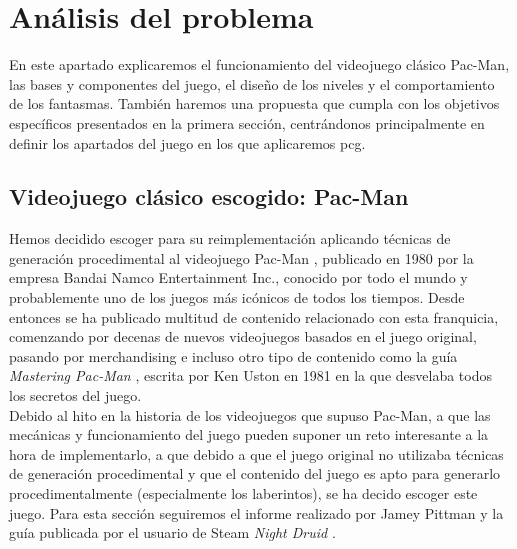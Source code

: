 \section{Análisis del problema}

    En este apartado explicaremos el funcionamiento del videojuego clásico Pac-Man, las bases y componentes del juego, el diseño de los niveles y el comportamiento de los fantasmas. También haremos una propuesta que cumpla con los objetivos específicos presentados en la primera sección, centrándonos principalmente en definir los apartados del juego en los que aplicaremos \acrshort{pcg}.

\subsection{Videojuego clásico escogido: Pac-Man}

    Hemos decidido escoger para su reimplementación aplicando técnicas de generación procedimental al videojuego Pac-Man \cite{officialSitePacman}, publicado en 1980 por la empresa Bandai Namco Entertainment Inc., conocido por todo el mundo y probablemente uno de los juegos más icónicos de todos los tiempos. Desde entonces se ha publicado multitud de contenido relacionado con esta franquicia, comenzando por decenas de nuevos videojuegos basados en el juego original, pasando por merchandising e incluso otro tipo de contenido como la guía \textit{Mastering Pac-Man} \cite{uston}, escrita por Ken Uston en 1981 en la que desvelaba todos los secretos del juego.\\
    
    Debido al hito en la historia de los videojuegos que supuso Pac-Man, a que las mecánicas y funcionamiento del juego pueden suponer un reto interesante a la hora de implementarlo, a que debido a que el juego original no utilizaba técnicas de generación procedimental y que el contenido del juego es apto para generarlo procedimentalmente (especialmente los laberintos), se ha decido escoger este juego. Para esta sección seguiremos el informe realizado por Jamey Pittman \cite{pittman2015} y la guía publicada por el usuario de Steam \textit{Night Druid} \cite{druid2016}. 
    
